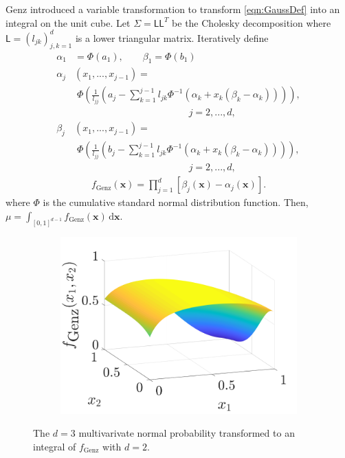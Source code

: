 \documentclass[twocolumn]{svjour3}          %
\newcommand{\bm}[1]{\boldsymbol{#1}}
\newcommand{\mSigma}{\mathsf{\Sigma}}
\newcommand{\dif}[1]{\text{d}{#1}}
\newcommand{\vx}{\bm{x}}
\newcommand{\dvx}{\dif{\bm{x}}}
\newcommand{\mL}{\mathsf{L}}
\begin{document}
Genz \cite{Gen93} introduced a variable transformation to transform \eqref{eqn:GaussDef} into an integral on the unit cube.  Let $\mSigma= \mL \mL^T$ be the Cholesky decomposition where $\mL = (l_{jk})_{j,k=1}^d$ is a lower triangular matrix.  Iteratively define
\begin{align*}
\alpha_1& = \Phi(a_1), \qquad \beta_1 = \Phi(b_1)
\\
\alpha_j&(x_1,...,x_{j-1}) = 
\\
&\; \Phi
\left(
\frac{1}{l_{jj}} 
\left(
a_j - \sum_{k=1}^{j-1} l_{jk} \Phi^{-1}(\alpha_k + x_k(\beta_k-\alpha_k))
\right)
\right), 
\\
&\hspace{5cm} j=2,...,d,
\\
\beta_j&(x_1,...,x_{j-1}) = 
\\
&\; \Phi
\left(
\frac{1}{l_{jj}} 
\left(
b_j - \sum_{k=1}^{j-1} l_{jk} \Phi^{-1}(\alpha_k + x_k(\beta_k-\alpha_k))
\right)
\right), 
\\
&\hspace{5cm} j=2,...,d,
\end{align*}
\begin{align}
\label{fGenzdef}
f_{\text{Genz}}(\vx) = \prod_{j=1}^d [\beta_j(\vx) - \alpha_j(\vx)].
\end{align}
where $\Phi$ is the cumulative standard normal distribution function.  Then, $\mu = \int_{[0,1]^{d-1}} f_{\text{Genz}}(\vx) \, \dvx$.

\begin{figure}
	\captionsetup[subfigure]{labelformat=empty}
	\centering
	\begin{subfigure}[h]{0.48\linewidth}
		\includegraphics[width=1.1\linewidth]{GenzFunc_varTx_none}
	\end{subfigure}
	\caption{The $d=3$ multivarivate normal probability transformed to an integral of $f_{\text{Genz}}$ with  $d=2$.}
	\label{fig:MVN_Genz}
\end{figure}
\end{document}
